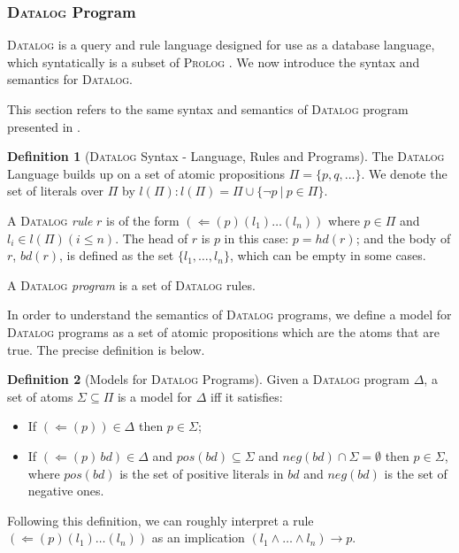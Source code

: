 \documentclass{article}
\theoremstyle{theorem}
\theoremstyle{lemma}
\theoremstyle{definition}
\newtheorem{definition}{Definition}[section]
\theoremstyle{remark}
\begin{document}
\subsubsection{\textsc{Datalog} Program}
\par \textsc{Datalog} is a query and rule language designed for use as a
database language, which syntatically is a subset of \textsc{Prolog}
\citep{datalog}. We now introduce the syntax and semantics for \textsc{Datalog}.
\par This section refers to the same syntax and semantics of \textsc{Datalog}
program presented in \citep{GDLpaper}.
\begin{definition}[\textsc{Datalog} Syntax - Language, Rules and Programs]
    The \textsc{Datalog} Language builds up on a set of atomic propositions $\Pi = \{p,q,\ldots \}$. We denote the set of literals over $\Pi$ by $l(\Pi):l(\Pi)=\Pi \cup \{\neg p\:|\: p \in \Pi \}$.

    A \textsc{Datalog} {\em rule} $r$ is of the form $(\Leftarrow(p)(l_1) \ldots (l_n))$ where $p \in \Pi$ and $l_i \in l(\Pi)(i\leq n)$. The head of $r$ is $p$ in this case: $p=hd(r)$; and the body of $r$, $bd(r)$, is defined as the set $\{l_1,\ldots,l_n \}$, which can be empty in some cases.

    A \textsc{Datalog} {\em program} is a set of \textsc{Datalog} rules.
\end{definition}
 \par In order to understand the semantics of \textsc{Datalog} programs, we
 define a model for \textsc{Datalog} programs as a set of atomic
 propositions which are the atoms that are true. The precise
 definition is below.
\begin{definition}[Models for \textsc{Datalog} Programs]
    Given a \textsc{Datalog} program $\Delta$, a set of atoms $\Sigma \subseteq \Pi$ is a model for $\Delta$ iff it satisfies:
    \begin{itemize}
    \item If $(\Leftarrow(p)) \in \Delta$ then $p \in \Sigma$;
    \item If $(\Leftarrow(p)\,bd) \in \Delta$ and $pos(bd) \subseteq \Sigma$ and $neg(bd) \cap \Sigma=\emptyset$ then $p \in \Sigma$, where $pos(bd)$ is the set of positive literals in $bd$ and $neg(bd)$ is the set of negative ones.
    \end{itemize}
    Following this definition, we can roughly interpret a rule
    $(\Leftarrow (p)(l_1) \ldots (l_n))$ as an implication \allowbreak
    $(l_1 \wedge \ldots \wedge l_n) \rightarrow p$.
\end{definition}
\end{document}
